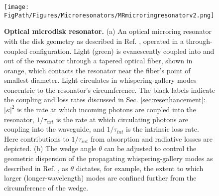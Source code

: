 \begin{figure}[htpb]
	\begin{center}
		\texttt{[image: \\FigPath/Figures/Microresonators/MRmicroringresonatorv2.png]}
	\end{center}
	\caption[Optical microdisk resonator]{\textbf{Optical microdisk resonator.} (a) An optical microring resonator with the disk geometry as described in Ref. \cite{Lee2012}, operated in a through-coupled configuration. Light (green) is evanescently coupled into and out of the resonator through a tapered optical fiber, shown in orange, which contacts the resonator near the fiber's point of smallest diameter. Light circulates in whispering-gallery modes concentric to the resonator's circumference. The black labels indicate the coupling and loss rates discussed in Sec. \ref{sec:resenhancement}: $|\kappa|^2$ is the rate at which incoming photons are coupled into the resonator, $1/\tau_{ext}$ is the rate at which circulating photons are coupling into the waveguide, and $1/\tau_{int}$ is the intrinsic loss rate. Here contributions to $1/\tau_{int}$ from absorption and radiative losses are depicted. (b) The wedge angle $\theta$ can be adjusted to control the geometric dispersion of the propagating whispering-gallery modes as described in Ref. \cite{Yang2016}, as $\theta$ dictates, for example, the extent to which larger (longer-wavelength) modes are confined further from the circumference of the wedge. }
	
	\label{fig:microringresonator}
\end{figure} 


